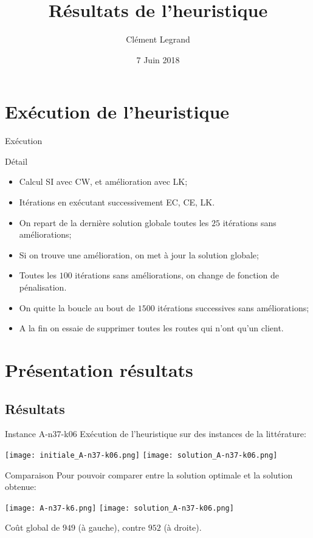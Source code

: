 \documentclass{beamer}
\title{Résultats de l'heuristique}
\author{Clément Legrand}
\date{7 Juin 2018}
\begin{document}
\section{Exécution de l'heuristique}

\begin{frame}[plain]
\titlepage
\end{frame}

\begin{frame}{Exécution}
\begin{block}{Détail}
\begin{itemize}
\item Calcul SI avec CW, et amélioration avec LK;
\item Itérations en exécutant successivement EC, CE, LK.
\item On repart de la dernière solution globale toutes les $25$ itérations sans améliorations;
\item Si on trouve une amélioration, on met à jour la solution globale;
\item Toutes les $100$ itérations sans améliorations, on change de fonction de pénalisation.
\item On quitte la boucle au bout de $1500$ itérations successives sans améliorations;
\item A la fin on essaie de supprimer toutes les routes qui n'ont qu'un client.
\end{itemize}
\end{block}
\end{frame}

\section{Présentation résultats}

\subsection{Résultats}

\begin{frame}{Instance A-n37-k06}
Exécution de l'heuristique sur des instances de la littérature:
\begin{center}
\texttt{[image: initiale\_A-n37-k06.png]}
\texttt{[image: solution\_A-n37-k06.png]}
\end{center}

\end{frame}

\begin{frame}{Comparaison}
Pour pouvoir comparer entre la solution optimale et la solution obtenue:
\begin{center}
\texttt{[image: A-n37-k6.png]}
\texttt{[image: solution\_A-n37-k06.png]}
\end{center}
Coût global de $949$ (à gauche), contre $952$ (à droite).
\end{frame}
\end{document}
